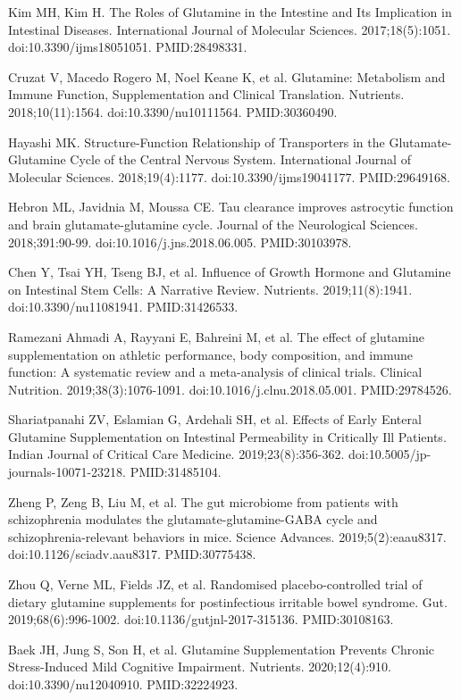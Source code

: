 \documentclass[12pt,oneside]{book}
\newcommand{\reff}[2]{\par\hangindent=7mm\hangafter=1\noindent[#1]\hspace{2mm}#2\par}
\begin{document}
\reff{10}{Kim MH, Kim H. The Roles of Glutamine in the Intestine and Its Implication in Intestinal Diseases. International Journal of Molecular Sciences. 2017;18(5):1051. doi:10.3390/ijms18051051. PMID:28498331.}

\reff{11}{Cruzat V, Macedo Rogero M, Noel Keane K, et al. Glutamine: Metabolism and Immune Function, Supplementation and Clinical Translation. Nutrients. 2018;10(11):1564. doi:10.3390/nu10111564. PMID:30360490.}

\reff{12}{Hayashi MK. Structure-Function Relationship of Transporters in the Glutamate-Glutamine Cycle of the Central Nervous System. International Journal of Molecular Sciences. 2018;19(4):1177. doi:10.3390/ijms19041177. PMID:29649168.}

\reff{13}{Hebron ML, Javidnia M, Moussa CE. Tau clearance improves astrocytic function and brain glutamate-glutamine cycle. Journal of the Neurological Sciences. 2018;391:90-99. doi:10.1016/j.jns.2018.06.005. PMID:30103978.}

\reff{14}{Chen Y, Tsai YH, Tseng BJ, et al. Influence of Growth Hormone and Glutamine on Intestinal Stem Cells: A Narrative Review. Nutrients. 2019;11(8):1941. doi:10.3390/nu11081941. PMID:31426533.}

\reff{15}{Ramezani Ahmadi A, Rayyani E, Bahreini M, et al. The effect of glutamine supplementation on athletic performance, body composition, and immune function: A systematic review and a meta-analysis of clinical trials. Clinical Nutrition. 2019;38(3):1076-1091. doi:10.1016/j.clnu.2018.05.001. PMID:29784526.}

\reff{16}{Shariatpanahi ZV, Eslamian G, Ardehali SH, et al. Effects of Early Enteral Glutamine Supplementation on Intestinal Permeability in Critically Ill Patients. Indian Journal of Critical Care Medicine. 2019;23(8):356-362. doi:10.5005/jp-journals-10071-23218. PMID:31485104.}

\reff{17}{Zheng P, Zeng B, Liu M, et al. The gut microbiome from patients with schizophrenia modulates the glutamate-glutamine-GABA cycle and schizophrenia-relevant behaviors in mice. Science Advances. 2019;5(2):eaau8317. doi:10.1126/sciadv.aau8317. PMID:30775438.}

\reff{18}{Zhou Q, Verne ML, Fields JZ, et al. Randomised placebo-controlled trial of dietary glutamine supplements for postinfectious irritable bowel syndrome. Gut. 2019;68(6):996-1002. doi:10.1136/gutjnl-2017-315136. PMID:30108163.}

\reff{19}{Baek JH, Jung S, Son H, et al. Glutamine Supplementation Prevents Chronic Stress-Induced Mild Cognitive Impairment. Nutrients. 2020;12(4):910. doi:10.3390/nu12040910. PMID:32224923.}
\end{document}
